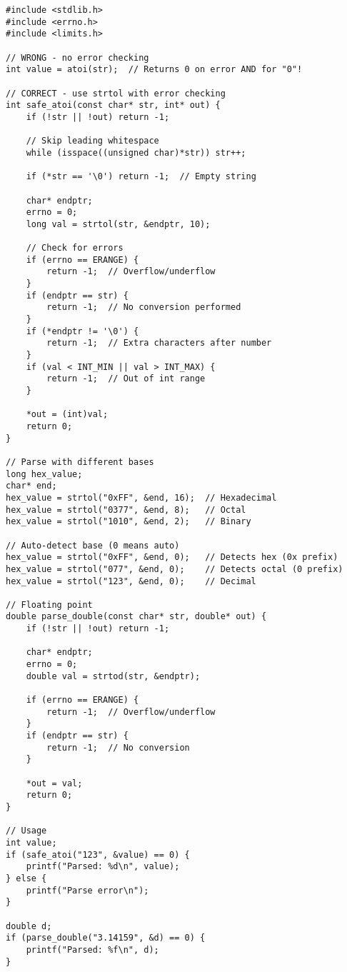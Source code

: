 \begin{lstlisting}
#include <stdlib.h>
#include <errno.h>
#include <limits.h>

// WRONG - no error checking
int value = atoi(str);  // Returns 0 on error AND for "0"!

// CORRECT - use strtol with error checking
int safe_atoi(const char* str, int* out) {
    if (!str || !out) return -1;

    // Skip leading whitespace
    while (isspace((unsigned char)*str)) str++;

    if (*str == '\0') return -1;  // Empty string

    char* endptr;
    errno = 0;
    long val = strtol(str, &endptr, 10);

    // Check for errors
    if (errno == ERANGE) {
        return -1;  // Overflow/underflow
    }
    if (endptr == str) {
        return -1;  // No conversion performed
    }
    if (*endptr != '\0') {
        return -1;  // Extra characters after number
    }
    if (val < INT_MIN || val > INT_MAX) {
        return -1;  // Out of int range
    }

    *out = (int)val;
    return 0;
}

// Parse with different bases
long hex_value;
char* end;
hex_value = strtol("0xFF", &end, 16);  // Hexadecimal
hex_value = strtol("0377", &end, 8);   // Octal
hex_value = strtol("1010", &end, 2);   // Binary

// Auto-detect base (0 means auto)
hex_value = strtol("0xFF", &end, 0);   // Detects hex (0x prefix)
hex_value = strtol("077", &end, 0);    // Detects octal (0 prefix)
hex_value = strtol("123", &end, 0);    // Decimal

// Floating point
double parse_double(const char* str, double* out) {
    if (!str || !out) return -1;

    char* endptr;
    errno = 0;
    double val = strtod(str, &endptr);

    if (errno == ERANGE) {
        return -1;  // Overflow/underflow
    }
    if (endptr == str) {
        return -1;  // No conversion
    }

    *out = val;
    return 0;
}

// Usage
int value;
if (safe_atoi("123", &value) == 0) {
    printf("Parsed: %d\n", value);
} else {
    printf("Parse error\n");
}

double d;
if (parse_double("3.14159", &d) == 0) {
    printf("Parsed: %f\n", d);
}
\end{lstlisting}


